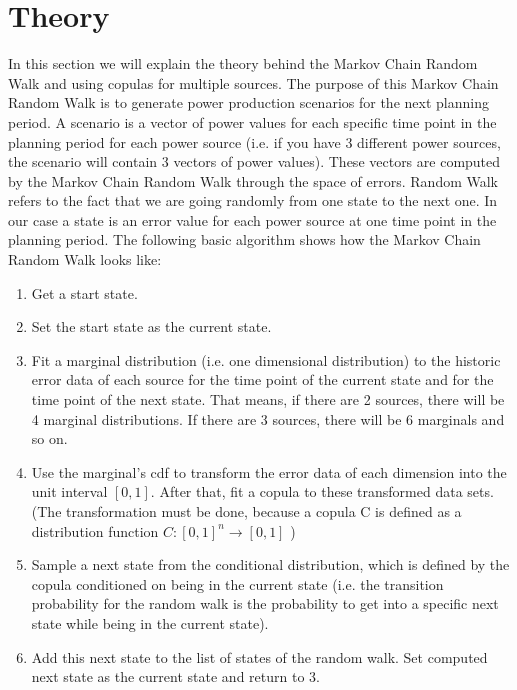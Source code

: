 \section{Theory}

In this section we will explain the theory behind the Markov Chain Random Walk and using copulas for multiple sources. The purpose of this Markov Chain Random Walk is to generate power production scenarios for the next planning period. A scenario is a vector of power values for each specific time point in the planning period for each power source (i.e. if you have 3 different power sources, the scenario will contain 3 vectors of power values). These vectors are computed by the Markov Chain Random Walk through the space of errors. Random Walk refers to the fact that we are going randomly from one state to the next one. In our case a state is an error value for each power source at one time point in the planning period. The following basic algorithm shows how the Markov Chain Random Walk looks like:\\

\begin{enumerate}
	\item Get a start state.
	\item Set the start state as the current state.
	\item Fit a marginal distribution (i.e. one dimensional distribution) to the historic error data of each source for the time point of the current state and for the time point of the next state. That means, if there are 2 sources, there will be 4 marginal distributions. If there are 3 sources, there will be 6 marginals and so on.
	\item Use the marginal's cdf to transform the error data of each dimension into the unit interval $[0,1]$. After that, fit a copula to these transformed data sets. (The transformation must be done, because a copula C is defined as a distribution function $C: [0,1]^n \rightarrow [0,1]$ ) 
	\item Sample a next state from the conditional distribution, which is defined by the copula conditioned on being in the current state (i.e. the transition probability for the random walk is the probability to get into a specific next state while being in the current state).
	\item Add this next state to the list of states of the random walk. Set computed next state as the current state and return to 3.
\end{enumerate}


